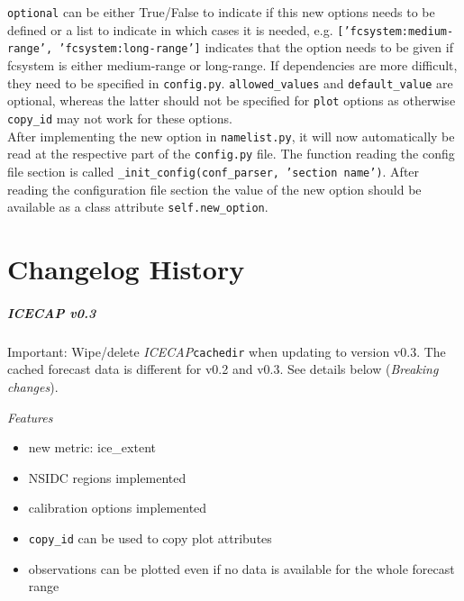 \documentclass[DIV=10, parskip=full]{scrreprt}
\newcommand{\ice}{\textit{ICECAP}\xspace}
\begin{document}
\texttt{optional} can be either True/False to indicate if this new options needs to be defined or a list to indicate in which cases it is needed, e.g. \texttt{['fcsystem:medium-range', 'fcsystem:long-range']} indicates that the option needs to be given if fcsystem is either medium-range or long-range. If dependencies are more difficult, they need to be specified in \texttt{config.py}. \texttt{allowed\_values} and \texttt{default\_value} are optional, whereas the latter should not be specified for \texttt{plot} options as otherwise \texttt{copy\_id} may not work for these options.\\

After implementing the new option in \texttt{namelist.py}, it will now automatically be read at the respective part of the \texttt{config.py} file. The function reading the config file section is called \texttt{\_init\_config(conf\_parser, 'section name')}. After reading the configuration file section the value of the new option should be available as a class attribute \texttt{self.new\_option}.

\chapter{Changelog History}
\paragraph{\textbf{\ice v0.3\\[5pt]}}

Important: Wipe/delete \ice \texttt{cachedir} when updating to version v0.3. The cached forecast data is different for v0.2 and v0.3. See details below (\textit{Breaking changes}).

\textit{Features}
\begin{itemize}
	\item new metric: ice\_extent
	\item NSIDC regions implemented
	\item calibration options implemented
	\item \texttt{copy\_id} can be used to copy plot attributes
	\item observations can be plotted even if no data is available for the whole forecast range
\end{itemize}
\end{document}

